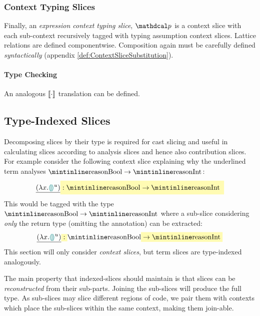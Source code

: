 \subsubsection{Context Typing Slices}
Finally, an \textit{expression context typing slice}, $\p$ is a context slice with each sub-context recursively tagged with typing assumption context slices. Lattice relations are defined componentwise. Composition again must be carefully defined \textit{syntactically} (appendix \cref{def:ContextSliceSubstitution}).

\paragraph{Type Checking} An analogous $\llbracket \cdot \rrbracket$ translation can be defined.

\subsection{Type-Indexed Slices}\label{sec:TypeIndexedSlices}
Decomposing slices by their type is required for cast slicing and useful in calculating slices according to analysis slices and hence also contribution slices. For example consider the following context slice explaining why the underlined term analyses $\code{Bool} \to \code{Int}$:
\[\underline{(\lambda x. \hole^u )} \hlcmaths[yellow!30]{:  \code{Bool} \hlcmaths[yellow!30]{\to \code{Int}}}\]
This would be tagged with the type $\code{Bool} \to \code{Int}$ where a sub-slice considering \textit{only} the  return type (omitting the  annotation) can be extracted:
\[\underline{(\lambda x. \hole^u )} \hlcmaths[yellow!30]{:}  \code{Bool} \hlcmaths[yellow!30]{\to \code{Int}}\]
This section will only consider \textit{context slices}, but term slices are type-indexed analogously.

The main property that indexed-slices should maintain is that slices can be \textit{reconstructed} from their sub-parts. Joining the sub-slices will produce the full type. As sub-slices may slice different regions of code, we pair them with contexts which place the sub-slices within the same context, making them join-able.

